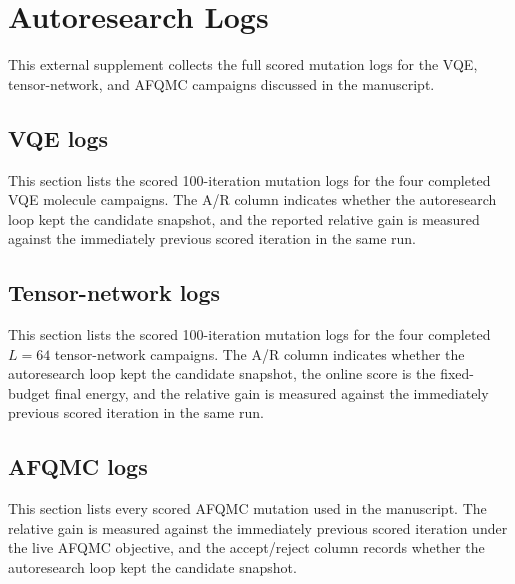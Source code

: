 \documentclass[10pt]{article}
\begin{document}
\section*{Autoresearch Logs}
This external supplement collects the full scored mutation logs for the VQE, tensor-network, and AFQMC campaigns discussed in the manuscript.

\subsection*{VQE logs}
This section lists the scored 100-iteration mutation logs for the four completed VQE molecule campaigns. The A/R column indicates whether the autoresearch loop kept the candidate snapshot, and the reported relative gain is measured against the immediately previous scored iteration in the same run.

{\scriptsize

}

\subsection*{Tensor-network logs}
This section lists the scored 100-iteration mutation logs for the four completed $L=64$ tensor-network campaigns. The A/R column indicates whether the autoresearch loop kept the candidate snapshot, the online score is the fixed-budget final energy, and the relative gain is measured against the immediately previous scored iteration in the same run.

{\scriptsize

}

\subsection*{AFQMC logs}
This section lists every scored AFQMC mutation used in the manuscript. The relative gain is measured against the immediately previous scored iteration under the live AFQMC objective, and the accept/reject column records whether the autoresearch loop kept the candidate snapshot.

{\scriptsize

}
\end{document}
